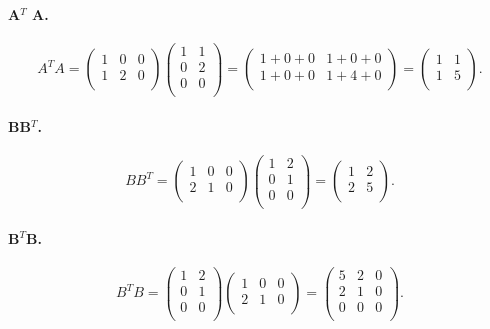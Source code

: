 \paragraph{A$^T$ A.}
\[ 
A^{T} A = \begin{pmatrix}
1 & 0 & 0\\
1 & 2 & 0\\
\end{pmatrix} \begin{pmatrix}
1 & 1\\
0 & 2\\
0 & 0\\
\end{pmatrix} = \begin{pmatrix}
1 + 0 + 0 & 1 + 0 + 0\\
1 + 0 + 0 & 1 + 4 + 0\\
\end{pmatrix} = \begin{pmatrix}
1 & 1\\
1 & 5\\
\end{pmatrix}
.\]

\paragraph{BB$^T$.}
\[ 
B B^{T} = \begin{pmatrix}
1 & 0 & 0\\
2 & 1 & 0\\
\end{pmatrix} \begin{pmatrix}
1 & 2\\
0 & 1\\
0 & 0\\
\end{pmatrix} = \begin{pmatrix}
1 & 2 \\
2 & 5 \\
\end{pmatrix}
.\]

\paragraph{B$^T$B.}
\[ 
B^{T}B = \begin{pmatrix}
1 & 2\\
0 & 1\\
0 & 0\\
\end{pmatrix} \begin{pmatrix}
1 & 0 & 0\\
2 & 1 & 0\\
\end{pmatrix} = \begin{pmatrix}
5 & 2 & 0\\
2 & 1 & 0\\
0 & 0 & 0\\
\end{pmatrix}
.\]

